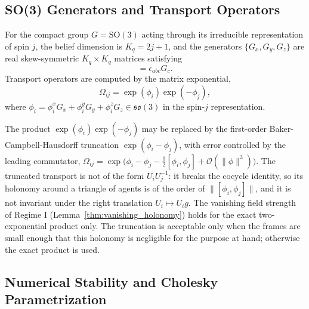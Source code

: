 \documentclass[11pt]{article}
\begin{document}
\subsection{SO(3) Generators and Transport Operators}

For the compact group $G = \mathrm{SO}(3)$ acting through its irreducible representation of spin $j$, the belief dimension is $K_q = 2j + 1$, and the generators $\{G_x, G_y, G_z\}$ are real skew-symmetric $K_q \times K_q$ matrices satisfying
\begin{equation}
[G_a, G_b] = \epsilon_{abc} G_c.
\end{equation}
Transport operators are computed by the matrix exponential,
\begin{equation}
\Omega_{ij} = \exp(\phi_i) \exp(-\phi_j),
\end{equation}
where $\phi_i = \phi_i^x G_x + \phi_i^y G_y + \phi_i^z G_z \in \mathfrak{so}(3)$ in the spin-$j$ representation.

The product $\exp(\phi_i)\exp(-\phi_j)$ may be replaced by the first-order Baker-Campbell-Hausdorff truncation $\exp(\phi_i - \phi_j)$, with error controlled by the leading commutator, $\Omega_{ij} = \exp\big(\phi_i - \phi_j - \tfrac{1}{2}[\phi_i, \phi_j] + \mathcal{O}(\|\phi\|^3)\big)$. The truncated transport is not of the form $U_iU_j^{-1}$: it breaks the cocycle identity, so its holonomy around a triangle of agents is of the order of $\|[\phi_i, \phi_j]\|$, and it is not invariant under the right translation $U_i \mapsto U_i g$. The vanishing field strength of Regime I (Lemma~\ref{thm:vanishing_holonomy}) holds for the exact two-exponential product only. The truncation is acceptable only when the frames are small enough that this holonomy is negligible for the purpose at hand; otherwise the exact product is used.

\subsection{Numerical Stability and Cholesky Parametrization}
\end{document}
